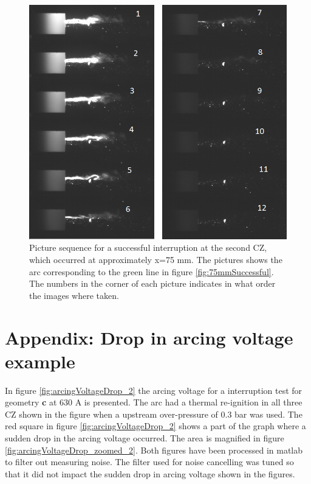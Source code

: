 \documentclass[10pt,b5paper,twoside]{article}
\begin{document}
\begin{figure}[H]
\centering
\includegraphics[scale=0.7, angle =0 ]{Bilder/Results/126_75_TR_OK.png}
\caption{Picture sequence for a successful interruption at the second CZ, which occurred at approximately x=75 mm. The pictures shows the arc corresponding to the green line in figure \ref{fig:75mmSuccessful}. The numbers in the corner of each picture indicates in what order the images where taken.} \label{fig:arcingVoltage_test_114_green_OK}
\end{figure}

\cleardoublepage

\section{Appendix: Drop in arcing voltage example} \label{app:DROP_ImageSequences}
\setcounter{figure}{0}
\setcounter{table}{0}
\makeatletter 
\renewcommand{\thefigure}{C.\@arabic\c@figure}
\makeatother

\makeatletter 
\renewcommand{\thetable}{C.\@arabic\c@table}
\makeatother

In figure \ref{fig:arcingVoltageDrop_2} the arcing voltage for a interruption test for geometry \textbf{c} at 630 A is presented. The arc had a thermal re-ignition in all three CZ shown in the figure when a upstream over-pressure of 0.3 bar was used. The red square in figure \ref{fig:arcingVoltageDrop_2} shows a part of the graph where a sudden drop in the arcing voltage occurred. The area is magnified in figure \ref{fig:arcingVoltageDrop_zoomed_2}. Both figures have been processed in matlab to filter out measuring noise. The filter used for noise cancelling was tuned so that it did not impact the sudden drop in arcing voltage shown in the figures.
\end{document}
